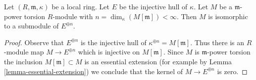 \begin{lemma}
\label{lemma-torsion-submodule-sum-injective-hulls}
Let $(R, \mathfrak m, \kappa)$ be a local ring.
Let $E$ be the injective hull of $\kappa$.
Let $M$ be a $\mathfrak m$-power torsion $R$-module
with $n = \dim_\kappa(M[\mathfrak m]) < \infty$.
Then $M$ is isomorphic to a submodule of $E^{\oplus n}$.
\end{lemma}

\begin{proof}
Observe that $E^{\oplus n}$ is the injective hull of
$\kappa^{\oplus n} = M[\mathfrak m]$. Thus there is an $R$-module map
$M \to E^{\oplus n}$ which is injective on $M[\mathfrak m]$.
Since $M$ is $\mathfrak m$-power torsion the inclusion
$M[\mathfrak m] \subset M$ is an essential extension
(for example by Lemma \ref{lemma-essential-extension})
we conclude that the kernel of $M \to E^{\oplus n}$ is zero.
\end{proof}
